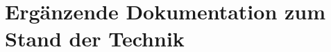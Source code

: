 \chapter{Ergänzende Dokumentation zum Stand der Technik}
\label{appchap:add_doc_related}

\lipsum[1]



